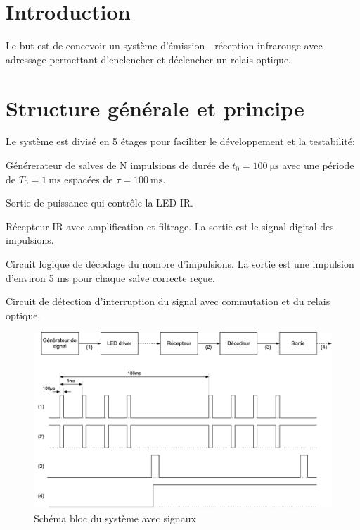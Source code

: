 \documentclass[french]{layout/Report}
\begin{document}


\section{Introduction}
Le but est de concevoir un système d'émission - réception infrarouge avec adressage
permettant d'enclencher et déclencher un relais optique.

\section{Structure générale et principe}

Le système est divisé en 5 étages pour faciliter le développement et la testabilité:

\begin{description}[leftmargin=!,labelwidth=4cm, labelindent=\parindent]
	\item[Générateur de signal] Générerateur de salves de N impulsions de durée de $t_0 =  \SI{100}{\micro\second}$ avec une période de $T_0 = \SI{1}{\milli\second}$ espacées de $\tau = \SI{100}{\milli\second}$.
\item[LED driver] Sortie de puissance qui contrôle la LED IR.
\item[Récepteur] Récepteur IR avec amplification et filtrage. La sortie est le signal digital des impulsions.
\item[Décodeur] Circuit logique de décodage du nombre d'impulsions. La sortie est une impulsion d'environ 5 \si{\milli\second} pour chaque salve correcte reçue.
\item[Sortie] Circuit de détection d'interruption du signal avec commutation et du relais optique.
\end{description}

\begin{figure}[H]
\centering
\vspace{5mm}
\includegraphics[width=\textwidth]{fig/IRemote_schema_structure}
\caption{Schéma bloc du système avec signaux}
\label{fig:schema_bloc}
\vspace{5mm}
\end{figure}
\end{document}
